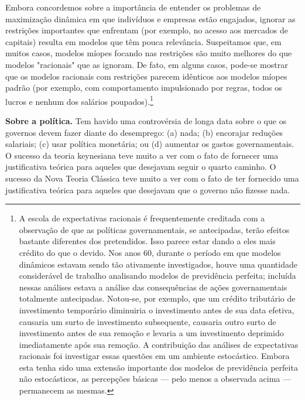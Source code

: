 \documentclass[12pt]{article}
\begin{document}
Embora concordemos sobre a importância de entender os problemas de maximização dinâmica em que indivíduos e empresas estão engajados, ignorar as restrições importantes que enfrentam (por exemplo, no acesso aos mercados de capitais) resulta em modelos que têm pouca relevância. Suspeitamos que, em muitos casos, modelos míopes focando nas restrições são muito melhores do que modelos "racionais" que as ignoram. De fato, em alguns casos, pode-se mostrar que os modelos racionais com restrições parecem idênticos aos modelos míopes padrão (por exemplo, com comportamento impulsionado por regras, todos os lucros e nenhum dos salários poupados).\footnote{A escola de expectativas racionais é frequentemente creditada com a observação de que as políticas governamentais, se antecipadas, terão efeitos bastante diferentes dos pretendidos. Isso parece estar dando a eles mais crédito do que o devido. Nos anos 60, durante o período em que modelos dinâmicos estavam sendo tão ativamente investigados, houve uma quantidade considerável de trabalho analisando modelos de previdência perfeita; incluída nessas análises estava a análise das consequências de ações governamentais totalmente antecipadas. Notou-se, por exemplo, que um crédito tributário de investimento temporário diminuiria o investimento antes de sua data efetiva, causaria um surto de investimento subsequente, causaria outro surto de investimento antes de sua remoção e levaria a um investimento deprimido imediatamente após sua remoção. A contribuição das análises de expectativas racionais foi investigar essas questões em um ambiente estocástico. Embora esta tenha sido uma extensão importante dos modelos de previdência perfeita não estocásticos, as percepções básicas — pelo menos a observada acima — permanecem as mesmas.}

\textbf{Sobre a política.} Tem havido uma controvérsia de longa data sobre o que os governos devem fazer diante do desemprego: (a) nada; (b) encorajar reduções salariais; (c) usar política monetária; ou (d) aumentar os gastos governamentais. O sucesso da teoria keynesiana teve muito a ver com o fato de fornecer uma justificativa teórica para aqueles que desejavam seguir o quarto caminho. O sucesso da Nova Teoria Clássica teve muito a ver com o fato de ter fornecido uma justificativa teórica para aqueles que desejavam que o governo não fizesse nada.
\end{document}
